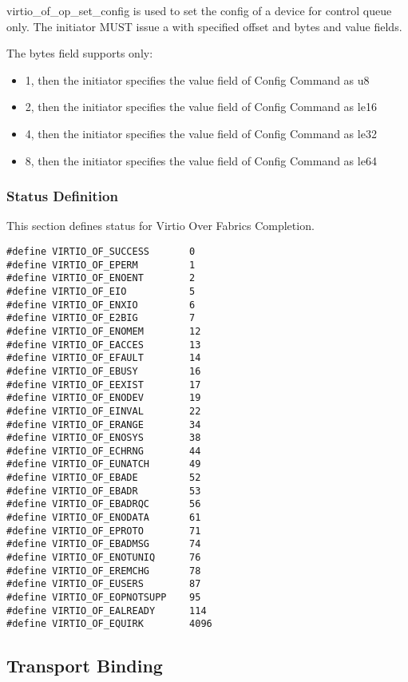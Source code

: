 virtio_of_op_set_config is used to set the config of a device for control queue only. The initiator MUST issue a  with specified offset and bytes and value fields.

The bytes field supports only:

\begin{itemize}
\item 1, then the initiator specifies the value field of Config Command as u8
\item 2, then the initiator specifies the value field of Config Command as le16
\item 4, then the initiator specifies the value field of Config Command as le32
\item 8, then the initiator specifies the value field of Config Command as le64
\end{itemize}

\subsubsection{Status Definition}\label{sec:Virtio Transport Options / Virtio Over Fabrics / Transmission Protocol / Status Definition}
This section defines status for Virtio Over Fabrics Completion.

\begin{lstlisting}
#define VIRTIO_OF_SUCCESS       0
#define VIRTIO_OF_EPERM         1
#define VIRTIO_OF_ENOENT        2
#define VIRTIO_OF_EIO           5
#define VIRTIO_OF_ENXIO         6
#define VIRTIO_OF_E2BIG         7
#define VIRTIO_OF_ENOMEM        12
#define VIRTIO_OF_EACCES        13
#define VIRTIO_OF_EFAULT        14
#define VIRTIO_OF_EBUSY         16
#define VIRTIO_OF_EEXIST        17
#define VIRTIO_OF_ENODEV        19
#define VIRTIO_OF_EINVAL        22
#define VIRTIO_OF_ERANGE        34
#define VIRTIO_OF_ENOSYS        38
#define VIRTIO_OF_ECHRNG        44
#define VIRTIO_OF_EUNATCH       49
#define VIRTIO_OF_EBADE         52
#define VIRTIO_OF_EBADR         53
#define VIRTIO_OF_EBADRQC       56
#define VIRTIO_OF_ENODATA       61
#define VIRTIO_OF_EPROTO        71
#define VIRTIO_OF_EBADMSG       74
#define VIRTIO_OF_ENOTUNIQ      76
#define VIRTIO_OF_EREMCHG       78
#define VIRTIO_OF_EUSERS        87
#define VIRTIO_OF_EOPNOTSUPP    95
#define VIRTIO_OF_EALREADY      114
#define VIRTIO_OF_EQUIRK        4096
\end{lstlisting}

\subsection{Transport Binding}\label{sec:Virtio Transport Options / Virtio Over Fabrics / Transport Binding}
